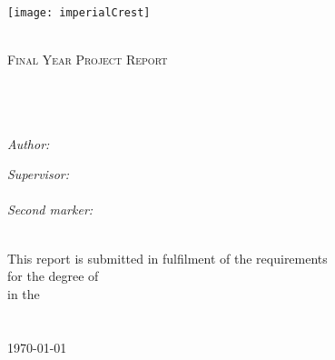 \documentclass[11pt, a4paper, oneside]{Thesis} %
\begin{document}
\begin{titlepage}
\begin{center}

\texttt{[image: imperialCrest]} %

\textsc{\LARGE \univname}\\[1cm] %
\textsc{\Large Final Year Project Report}\\[0.5cm] %

\HRule \\[0.4cm] %
{\huge \bfseries \ttitle}\\[0.1cm] %
\HRule \\[1.5cm] %
 
\begin{minipage}{0.4\textwidth}
\begin{flushleft} \large
\emph{Author:}\\
{\authornames} %
\end{flushleft}
\end{minipage}
\begin{minipage}{0.4\textwidth}
\begin{flushright} \large
\emph{Supervisor:} \\
{\supname} \\%
\emph{Second marker:} \\
{\secmark}
\end{flushright}
\end{minipage}\\[2cm]
 
\large This report is submitted in fulfilment of the requirements\\ for the degree of \textit{\degreename}\\ %
in the\\
\deptname\\\univname\\[1.5cm] %

{\large \today}\\[0.1cm] %

\vfill
\end{center}

\end{titlepage}

\thispagestyle{empty}
\mbox{}
\newpage
\end{document}
